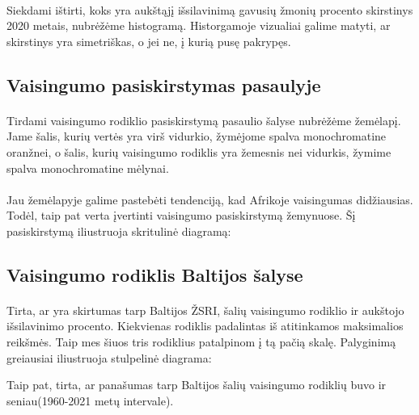 \paragraph{} Siekdami ištirti, koks yra aukštąjį išsilavinimą gavusių žmonių procento skirstinys 2020 metais, nubrėžėme histogramą. Historgamoje vizualiai galime matyti, ar skirstinys yra simetriškas, o jei ne, į kurią pusę pakrypęs.
\pagebreak

\subsection{Vaisingumo pasiskirstymas pasaulyje}
\paragraph{} Tirdami vaisingumo rodiklio pasiskirstymą pasaulio šalyse nubrėžėme žemėlapį. Jame šalis, kurių vertės yra virš vidurkio, žymėjome spalva monochromatine oranžnei, o šalis, kurių vaisingumo rodiklis yra žemesnis nei vidurkis, žymime spalva monochromatine mėlynai.

\paragraph{} Jau žemėlapyje galime pastebėti tendenciją, kad Afrikoje vaisingumas didžiausias. Todėl, taip pat verta įvertinti vaisingumo pasiskirstymą žemynuose. Šį pasiskirstymą iliustruoja skritulinė diagramą:
\pagebreak

\subsection{Vaisingumo rodiklis Baltijos šalyse}
\paragraph{} Tirta, ar yra skirtumas tarp Baltijos ŽSRI, šalių vaisingumo rodiklio ir aukštojo išsilavinimo procento. Kiekvienas rodiklis padalintas iš atitinkamos maksimalios reikšmės. Taip mes šiuos tris rodiklius patalpinom į tą pačią skalę. Palyginimą greiausiai iliustruoja stulpelinė diagrama:

Taip pat, tirta, ar panašumas tarp Baltijos šalių vaisingumo rodiklių buvo ir seniau(1960-2021 metų intervale). 
